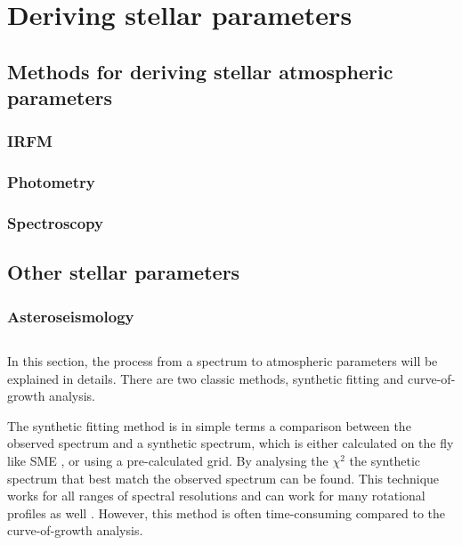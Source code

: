 
\chapter{Deriving stellar parameters}
\label{cha:method}


\section{Methods for deriving stellar atmospheric parameters}

\subsection{IRFM}

\subsection{Photometry}

\subsection{Spectroscopy}


\section{Other stellar parameters}

\subsection{Asteroseismology}


\section{\FASMA}
\label{sec:parameters}

In this section, the process from a spectrum to atmospheric parameters will be
explained in details. There are two classic methods, synthetic fitting and
curve-of-growth analysis.

The synthetic fitting method is in simple terms a comparison between the
observed spectrum and a synthetic spectrum, which is either calculated on the
fly like SME \citep{Valenti1996}, or using a pre-calculated grid. By analysing
the $\chi^2$ the synthetic spectrum that best match the observed spectrum can be
found. This technique works for all ranges of spectral resolutions and can work
for many rotational profiles as well \citep[see e.g.][]{Tsantaki2017}. However,
this method is often time-consuming compared to the curve-of-growth analysis.

